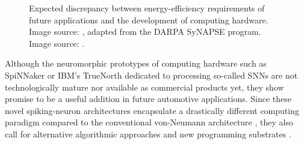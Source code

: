 \begin{figure}[h!]
    \centering
    \caption{Expected discrepancy between energy-efficiency requirements of future applications and the development of computing hardware.~\protect{} Image source: \citet{Farahini2016}, adapted from the \acs{DARPA} \acs{SyNAPSE} program.~\protect{} Image source: \citet{Marr2013}.}
    \label{fig:energy_efficiency_issues}
\end{figure}
Although the neuromorphic prototypes of computing hardware such as \ac{SpiNNaker} \citep{Furber2014} or  IBM's TrueNorth \citep{Akopyan2015} dedicated to processing so-called \acp{SNN} are not technologically mature nor available as commercial products yet, they show promise to be a useful addition in future automotive applications.
Since these novel spiking-neuron architectures encapsulate a drastically different computing paradigm compared to the conventional von-Neumann architecture \citep{vonNeumann1993}, they also call for alternative algorithmic approaches and new programming substrates \citep{Amir2013}.

